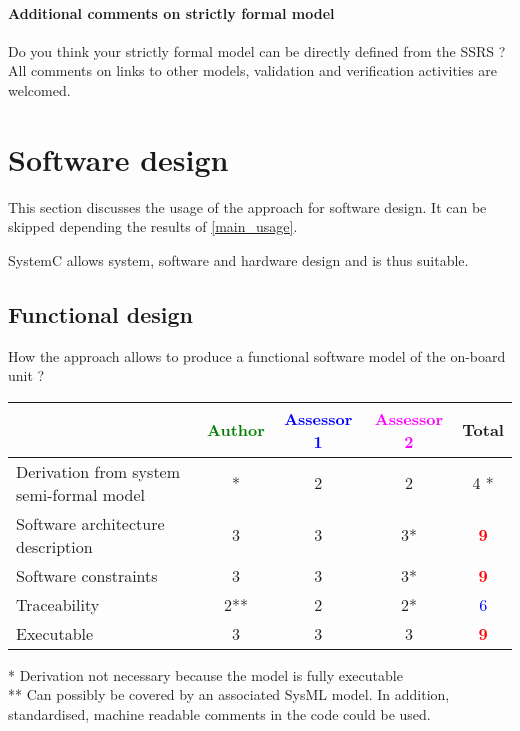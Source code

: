 \paragraph{Additional comments on strictly formal model} Do you think your strictly formal model can be directly defined from the SSRS ?
All comments on links to other models, validation and verification activities are welcomed.


\section{Software design}
This section discusses the usage of the approach for software design.
It can be skipped depending the results of \ref{main_usage}.

\begin{author_comment}
SystemC allows system, software and hardware design and is thus suitable.
\end{author_comment}

\subsection{Functional design}

How the approach allows to produce a functional software model of the on-board unit ?

\begin{tabular}{|l | c | c | c | c|}
\hline
& \textcolor{green}{Author} & \textcolor{blue}{Assessor 1} & \textcolor{magenta}{Assessor 2} & Total \\
\hline
Derivation from system semi-formal model &* &2 &2 & 4    * \\
\hline
Software architecture description &3 &3 &3* & \textcolor{red}{\textbf{9}} \\
\hline
Software constraints &3 &3 &3* & \textcolor{red}{\textbf{9}} \\
\hline
Traceability &2** &2 &2* & \textcolor{blue}{6} \\
\hline
Executable &3 &3 &3 & \textcolor{red}{\textbf{9}} \\
\hline
\end{tabular}

\begin{author_comment}
* Derivation not necessary because the model is fully executable\\
** Can possibly be covered by an associated SysML model. In addition, standardised, machine readable comments in the code could be used.\\
\end{author_comment}

